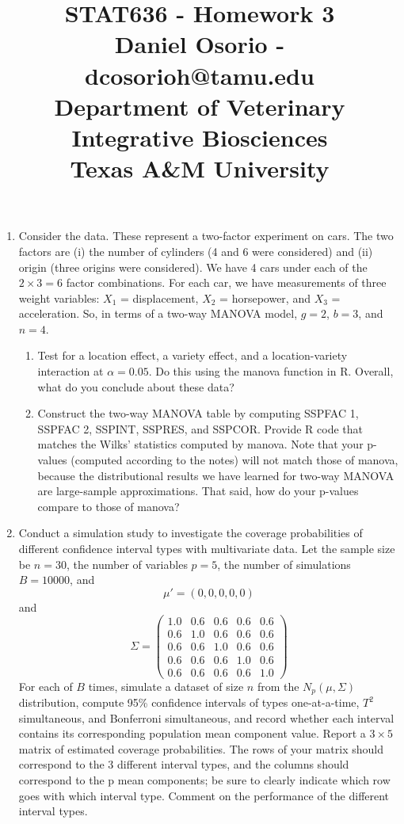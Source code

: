 \documentclass[12pt,a4paper]{paper}
\begin{document}
\title{STAT636 - Homework 3\\\small{Daniel Osorio - dcosorioh@tamu.edu\\Department of Veterinary Integrative Biosciences\\Texas A\&M University}}
\maketitle

\begin{enumerate}
\item Consider the  data. These represent a two-factor experiment on cars. The two factors are (i) the number of cylinders (4 and 6 were considered) and (ii) origin (three origins were considered). We have 4 cars under each of the $2 \times 3 = 6$ factor combinations. For each car, we have measurements of three weight variables: $X_{1}$ = displacement, $X_{2}$ = horsepower, and $X_{3}$ = acceleration. So, in terms of a two-way MANOVA model, $g = 2$, $b = 3$, and $n = 4$.
\begin{enumerate}
\item Test for a location effect, a variety effect, and a location-variety interaction at $\alpha = 0.05$. Do this using the manova function in R. Overall, what do you conclude about these data?
\item Construct the two-way MANOVA table by computing SSPFAC 1, SSPFAC 2, SSPINT, SSPRES, and SSPCOR. Provide R code that matches the Wilks’ statistics computed by manova. Note that your p-values (computed according to the notes) will not match those of manova, because the distributional results we have learned for two-way MANOVA are large-sample approximations. That said, how do your p-values compare to those of manova?
\end{enumerate}
\item Conduct a simulation study to investigate the coverage probabilities of different confidence
interval types with multivariate data. Let the sample size be $n = 30$, the number of variables $p = 5$, the number of simulations $B = 10000$, and \[\mu' =\left(0, 0, 0, 0, 0\right)\] and \[\Sigma = \left(\begin{array}{ccccc}1.0&0.6&0.6&0.6&0.6\\0.6&1.0&0.6&0.6&0.6\\0.6&0.6&1.0&0.6&0.6\\0.6&0.6&0.6&1.0&0.6\\0.6&0.6&0.6&0.6&1.0\end{array}\right)\] For each of $B$ times, simulate a dataset of size $n$ from the $N_{p}\left(\mu,\Sigma\right)$ distribution, compute 95\% confidence intervals of types one-at-a-time, $T^{2}$ simultaneous, and Bonferroni simultaneous, and record whether each interval contains its corresponding population mean component value. Report a $3 \times 5$ matrix of estimated coverage probabilities. The rows of your matrix should correspond to the 3 different interval types, and the columns should correspond to the p mean components; be sure to clearly indicate which row goes with which interval type. Comment on the performance of the different interval types.

\end{enumerate}
\end{document}
